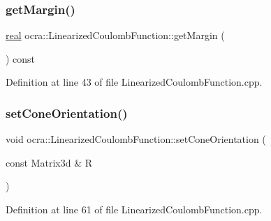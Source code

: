 \hypertarget{classocra_1_1LinearizedCoulombFunction_af709532102470f85296dd631c8d9c6cf}{}\label{classocra_1_1LinearizedCoulombFunction_af709532102470f85296dd631c8d9c6cf} 
\subsubsection{\texorpdfstring{get\+Margin()}{getMargin()}}
{\footnotesize\ttfamily \hyperlink{namespaceocra_af4478308ca113669e67d72f9a3050469}{real} ocra\+::\+Linearized\+Coulomb\+Function\+::get\+Margin (\begin{DoxyParamCaption}{ }\end{DoxyParamCaption}) const}



Definition at line 43 of file Linearized\+Coulomb\+Function.\+cpp.

\hypertarget{classocra_1_1LinearizedCoulombFunction_a682565ed83043ec13a966bd0db51f123}{}\label{classocra_1_1LinearizedCoulombFunction_a682565ed83043ec13a966bd0db51f123} 
\subsubsection{\texorpdfstring{set\+Cone\+Orientation()}{setConeOrientation()}}
{\footnotesize\ttfamily void ocra\+::\+Linearized\+Coulomb\+Function\+::set\+Cone\+Orientation (\begin{DoxyParamCaption}\item[{const Matrix3d \&}]{R }\end{DoxyParamCaption})}



Definition at line 61 of file Linearized\+Coulomb\+Function.\+cpp.

\hypertarget{classocra_1_1LinearizedCoulombFunction_ab01ef6ae4c98929ebc4ef1035fe3df47}{}\label{classocra_1_1LinearizedCoulombFunction_ab01ef6ae4c98929ebc4ef1035fe3df47} 
